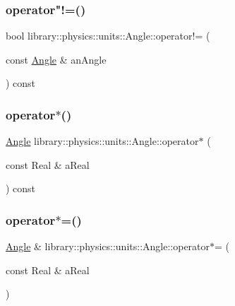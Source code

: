 \subsubsection{\texorpdfstring{operator"!=()}{operator!=()}}
{\footnotesize\ttfamily bool library\+::physics\+::units\+::\+Angle\+::operator!= (\begin{DoxyParamCaption}\item[{const \hyperlink{classlibrary_1_1physics_1_1units_1_1_angle}{Angle} \&}]{an\+Angle }\end{DoxyParamCaption}) const}

\mbox{\label{classlibrary_1_1physics_1_1units_1_1_angle_a958b708b331ded088189882187a4de89}} 
\subsubsection{\texorpdfstring{operator$\ast$()}{operator*()}}
{\footnotesize\ttfamily \hyperlink{classlibrary_1_1physics_1_1units_1_1_angle}{Angle} library\+::physics\+::units\+::\+Angle\+::operator$\ast$ (\begin{DoxyParamCaption}\item[{const Real \&}]{a\+Real }\end{DoxyParamCaption}) const}

\mbox{\label{classlibrary_1_1physics_1_1units_1_1_angle_af14d361f18244d859a3829c40aba6a14}} 
\subsubsection{\texorpdfstring{operator$\ast$=()}{operator*=()}}
{\footnotesize\ttfamily \hyperlink{classlibrary_1_1physics_1_1units_1_1_angle}{Angle} \& library\+::physics\+::units\+::\+Angle\+::operator$\ast$= (\begin{DoxyParamCaption}\item[{const Real \&}]{a\+Real }\end{DoxyParamCaption})}

